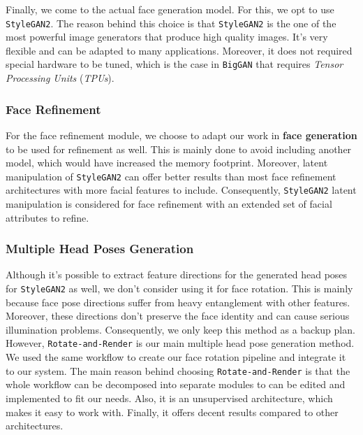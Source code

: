 Finally, we come to the actual face generation model. For this, we opt to use \texttt{StyleGAN2}. The reason behind this choice is that \texttt{StyleGAN2} is the one of the most powerful image generators that produce high quality images. It's very flexible and can be adapted to many applications. Moreover, it does not required special hardware to be tuned, which is the case in \texttt{BigGAN} that requires \emph{Tensor Processing Units} (\emph{TPUs}).

\subsubsection{Face Refinement}
For the face refinement module, we choose to adapt our work in \textbf{face generation} to be used for refinement as well. This is mainly done to avoid including another model, which would have increased the memory footprint. Moreover, latent manipulation of \texttt{StyleGAN2} can offer better results than most face refinement architectures with more facial features to include. Consequently, \texttt{StyleGAN2} latent manipulation is considered for face refinement with an extended set of facial attributes to refine.

\subsubsection{Multiple Head Poses Generation}
Although it's possible to extract feature directions for the generated head poses for \texttt{StyleGAN2} as well, we don't consider using it for face rotation. This is mainly because face pose directions suffer from heavy entanglement with other features. Moreover, these directions don't preserve the face identity and can cause serious illumination problems. Consequently, we only keep this method as a backup plan. However, \texttt{Rotate-and-Render} is our main multiple head pose generation method. We used the same workflow to create our face rotation pipeline and integrate it to our system. The main reason behind choosing \texttt{Rotate-and-Render} is that the whole workflow can be decomposed into separate modules to can be edited and implemented to fit our needs. Also, it is an unsupervised architecture, which makes it easy to work with. Finally, it offers decent results compared to other architectures.
